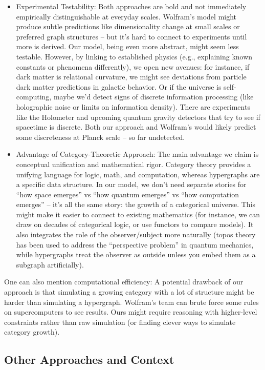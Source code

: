 \documentclass{article}
\begin{document}
\begin{itemize}
\item Experimental Testability: Both approaches are bold and not immediately empirically distinguishable at everyday scales. Wolfram’s model might produce subtle predictions like dimensionality change at small scales or preferred graph structures – but it’s hard to connect to experiments until more is derived. Our model, being even more abstract, might seem less testable. However, by linking to established physics (e.g., explaining known constants or phenomena differently), we open new avenues: for instance, if dark matter is relational curvature, we might see deviations from particle dark matter predictions in galactic behavior\cite{verlinde2016}. Or if the universe is self-computing, maybe we’d detect signs of discrete information processing (like holographic noise or limits on information density). There are experiments like the Holometer and upcoming quantum gravity detectors that try to see if spacetime is discrete. Both our approach and Wolfram’s would likely predict some discreteness at Planck scale – so far undetected.
\item Advantage of Category-Theoretic Approach: The main advantage we claim is conceptual unification and mathematical rigor. Category theory provides a unifying language for logic, math, and computation, whereas hypergraphs are a specific data structure. In our model, we don’t need separate stories for “how space emerges” vs “how quantum emerges” vs “how computation emerges” – it’s all the same story: the growth of a categorical universe. This might make it easier to connect to existing mathematics (for instance, we can draw on decades of categorical logic, or use functors to compare models). It also integrates the role of the observer/subject more naturally (topos theory has been used to address the “perspective problem” in quantum mechanics\cite{doering2008}, while hypergraphs treat the observer as outside unless you embed them as a subgraph artificially).
\end{itemize}

One can also mention computational efficiency: A potential drawback of our approach is that simulating a growing category with a lot of structure might be harder than simulating a hypergraph. Wolfram’s team can brute force some rules on supercomputers to see results. Ours might require reasoning with higher-level constraints rather than raw simulation (or finding clever ways to simulate category growth).

\subsection{Other Approaches and Context}
\end{document}
